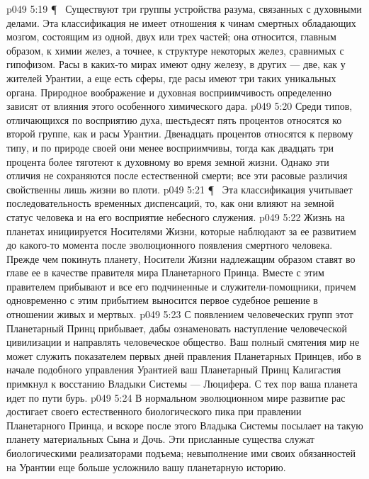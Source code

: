 \vs p049 5:19 \P\ \bibnobreakspace {} Существуют три группы устройства разума, связанных с духовными делами. Эта классификация не имеет отношения к чинам смертных обладающих мозгом, состоящим из одной, двух или трех частей; она относится, главным образом, к химии желез, а точнее, к структуре некоторых желез, сравнимых с гипофизом. Расы в каких\hyp{}то мирах имеют одну железу, в других --- две, как у жителей Урантии, а еще есть сферы, где расы имеют три таких уникальных органа. Природное воображение и духовная восприимчивость определенно зависят от влияния этого особенного химического дара.
\vs p049 5:20 Среди типов, отличающихся по восприятию духа, шестьдесят пять процентов относятся ко второй группе, как и расы Урантии. Двенадцать процентов относятся к первому типу, и по природе своей они менее восприимчивы, тогда как двадцать три процента более тяготеют к духовному во время земной жизни. Однако эти отличия не сохраняются после естественной смерти; все эти расовые различия свойственны лишь жизни во плоти.
\vs p049 5:21 \P\ \bibnobreakspace {} Эта классификация учитывает последовательность временных диспенсаций, то, как они влияют на земной статус человека и на его восприятие небесного служения.
\vs p049 5:22 Жизнь на планетах инициируется Носителями Жизни, которые наблюдают за ее развитием до какого\hyp{}то момента после эволюционного появления смертного человека. Прежде чем покинуть планету, Носители Жизни надлежащим образом ставят во главе ее в качестве правителя мира Планетарного Принца. Вместе с этим правителем прибывают и все его подчиненные и служители\hyp{}помощники, причем одновременно с этим прибытием выносится первое судебное решение в отношении живых и мертвых.
\vs p049 5:23 С появлением человеческих групп этот Планетарный Принц прибывает, дабы ознаменовать наступление человеческой цивилизации и направлять человеческое общество. Ваш полный смятения мир не может служить показателем первых дней правления Планетарных Принцев, ибо в начале подобного управления Урантией ваш Планетарный Принц Калигастия примкнул к восстанию Владыки Системы --- Люцифера. С тех пор ваша планета идет по пути бурь.
\vs p049 5:24 В нормальном эволюционном мире развитие рас достигает своего естественного биологического пика при правлении Планетарного Принца, и вскоре после этого Владыка Системы посылает на такую планету материальных Сына и Дочь. Эти присланные существа служат биологическими реализаторами подъема; невыполнение ими своих обязанностей на Урантии еще больше усложнило вашу планетарную историю.
